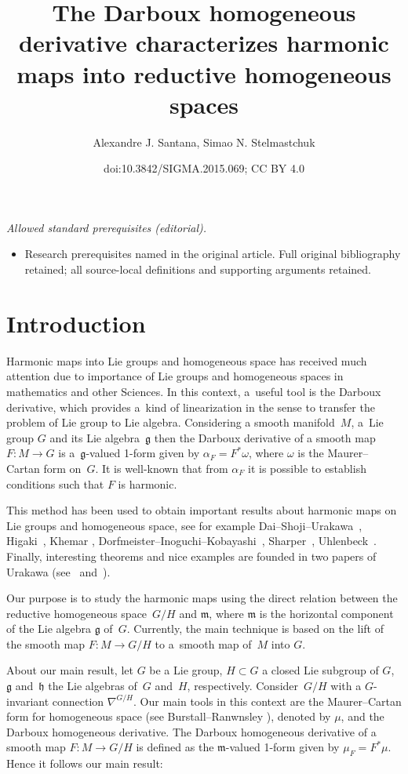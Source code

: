\documentclass[10pt,a4paper]{amsart}
\title{The Darboux homogeneous derivative characterizes harmonic maps into reductive homogeneous spaces}
\author{Alexandre J. Santana, Simao N. Stelmastchuk}
\date{doi:10.3842/SIGMA.2015.069; CC BY 4.0}
\numberwithin{equation}{section}
\newcommand{\g}{\mathfrak{g}}
\newcommand{\m}{\mathfrak{m}}
\begin{document}
\maketitle
\noindent\textit{Allowed standard prerequisites (editorial).}\begin{itemize}
\item Research prerequisites named in the original article. Full original bibliography retained; all source-local definitions and supporting arguments retained.
\end{itemize}\medskip
\section{Introduction}

Harmonic maps into Lie groups and homogeneous space has received
much  attention due to importance of Lie groups and
homogeneous spaces in mathematics and other Sciences.  In this
context, a~useful tool is the Darboux derivative, which provides a~kind of linearization in the sense to transfer the problem of Lie
group to Lie algebra. Considering a smooth manifold~$M$, a~Lie group
$G$ and its Lie algebra~$\g$ then the Darboux derivative of a smooth
map $F\colon M \rightarrow G$ is a~$\g$-valued 1-form given by $\alpha_F
= F^*\omega$, where $\omega$ is the Maurer--Cartan form on~$G$. It is
well-known that from $\alpha_F$ it is possible to establish
conditions such that $F$ is harmonic.

This method has been used to obtain important results about harmonic
maps on Lie groups and homogeneous space, see for example
Dai--Shoji--Urakawa~\cite{DaiY/ShojiM/UrakawaH}, Higaki~\cite{Higaki},
Khemar \cite{Khemar}, Dorf\-meis\-ter--Inoguchi--Kobayashi~\cite{DorfmeisterJ/InoguchiJ/KobayashiS}, Sharper~\cite{Sharpe},
Uhlenbeck~\cite{Uhlenbeck}. Finally, interesting theorems and nice
examples are founded in   two papers of Urakawa (see~\cite{Urakawa2}
and~\cite{Urakawa3}).

Our purpose is to study the harmonic maps using the direct relation between the reductive homogeneous space~$G/H$ and ${\mathfrak m}$, where
${\mathfrak m}$ is the horizontal component of the Lie algebra ${\mathfrak g}$ of~$G$. Currently, the main technique is based on the lift
of the smooth map $F\colon M \rightarrow G/H$ to a~smooth map of~$M$ into $G$.

About our main result, let $G$ be a Lie group, $H\subset G$ a closed Lie subgroup of $G$, $\mathfrak{g}$ and~$\mathfrak{h}$ the Lie algebras of~$G$ and~$H$, respectively. Consider~$G/H$ with a $G$-invariant connection $\nabla^{G/H}$. Our main tools in this context are the Maurer--Cartan form for
homogeneous space (see Burstall--Ranwnsley \cite{BurstallF/RanwnsleyJ}), denoted by $\mu$, and the Darboux homogeneous derivative.  The Darboux homogeneous derivative of a smooth map $F\colon M \rightarrow G/H$ is def\/ined as the $\m$-valued 1-form given by $\mu_F  =F^*\mu$. Hence it follows our main result:
\end{document}
